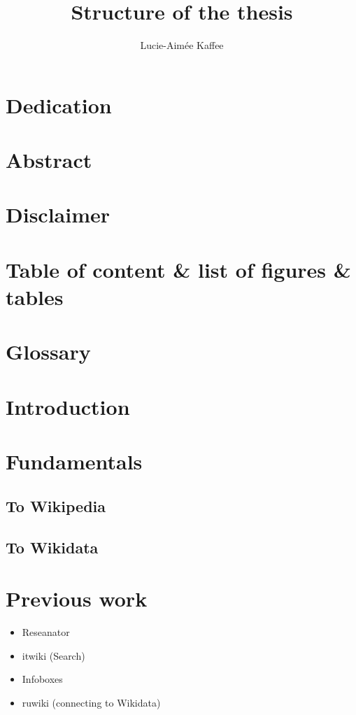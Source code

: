 \documentclass[11pt]{article}
\title {{Structure of the thesis}}
\author {Lucie-Aim\'{e}e Kaffee}
\date{}
\begin{document}
\maketitle

\section{Dedication}

\section{Abstract}

\section{Disclaimer}

\section{Table of content \& list of figures \& tables}

\section {Glossary}

\section{Introduction}

\section{Fundamentals}
\subsection{To Wikipedia}
\subsection{To Wikidata}

\section{Previous work}
\begin{itemize}
\item Reseanator
\item itwiki (Search)
\item Infoboxes
\item ruwiki (connecting to Wikidata)
\end{itemize}
\end{document}
